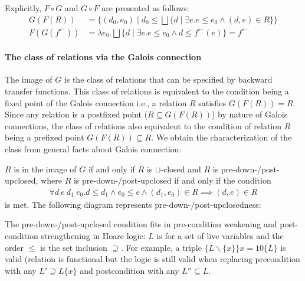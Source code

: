 \documentclass{llncs}
\newcommand{\fb}{{f^{\leftarrow}}}
\newcommand{\join}{\sqcup}
\newcommand{\bigjoin}{\bigsqcup}
\newcommand{\comp}{\circ}
\newcommand{\rotleq}{\rotatebox[origin=c]{90}{$\leq$}}
\begin{document}
  Explicitly, $F \comp G$ and $G \comp F$ are presented as follows:
  \begin{align*}
    G(F(R)) &= \{ (d_{0},e_{0}) \mid d_{0} \leq \bigjoin \{ d \mid \exists e.e \leq e_{0} \land (d,e) \in R \}\} \\
    F(G(\fb)) &= \lambda e_{0} . \bigjoin \{ d \mid \exists e. e \leq e_{0} \land d \leq \fb(e) \} = \fb
  \end{align*}

\paragraph{The class of relations via the Galois connection}
  The image of $G$ is the class of relations that can be specified by backward transfer functions.
  This class of relations is equivalent to the condition being a fixed point of the Galois connection i.e., a relation $R$ satisfies $G(F(R)) = R$. Since any relation is a postfixed point ($R \subseteq G(F(R))$) by nature of Galois connections, the class of relations also equivalent to the condition of relation $R$ being a prefixed point $G(F(R)) \subseteq R$.
  We obtain the characterization of the class from general facts about Galois connection:
  \begin{proposition}\label{prop:predown-postup}
  $R$ is in the image of $G$ if and only if $R$ is $\join$-closed and $R$ is pre-down-/post-upclosed,
  where $R$ is pre-down-/post-upclosed if and only if the condition
  \begin{align*}
  \forall d\ e\ d_{1 }\ e_{0}. d \leq d_{1} \land e_{0} \leq e \land (d_{1}, e_{0}) \in R \implies (d, e) \in R
  \end{align*}
  is met.
  The following diagram represents pre-down-/post-upclosedness:
  \begin{center}
  \end{center}
  \end{proposition}


  \begin{example}
    The pre-down-/post-upclosed condition fits in pre-condition weakening and post-condition strengthening in Hoare logic: $L$ is for a set of live variables and the order $\leq$ is the set inclusion $\supseteq$.
    For example, a triple $\{ L \backslash \{ x \} \} x = 10 \{ L \}$ is valid (relation is functional but the logic is still valid when replacing precondition with any $L' \supseteq L \{ x \}$ and postcondition with any $L'' \subseteq L$.
  \end{example}
\end{document}
